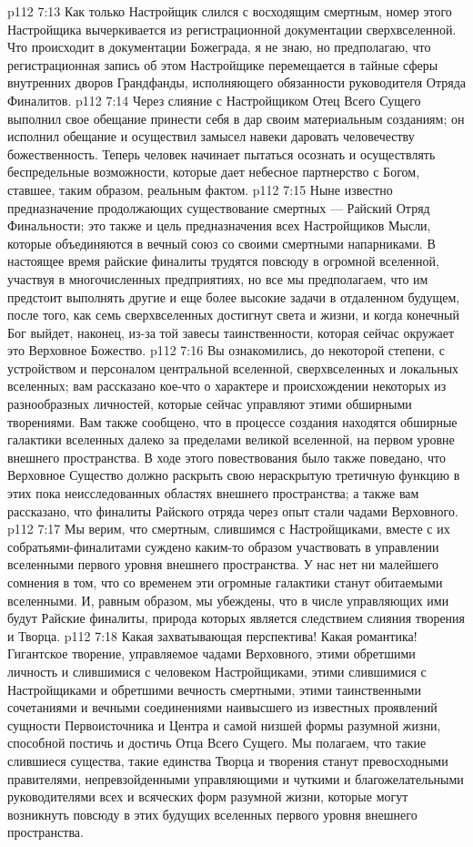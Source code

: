 \vs p112 7:13 Как только Настройщик слился с восходящим смертным, номер этого Настройщика вычеркивается из регистрационной документации сверхвселенной. Что происходит в документации Божеграда, я не знаю, но предполагаю, что регистрационная запись об этом Настройщике перемещается в тайные сферы внутренних дворов Грандфанды, исполняющего обязанности руководителя Отряда Финалитов.
\vs p112 7:14 Через слияние с Настройщиком Отец Всего Сущего выполнил свое обещание принести себя в дар своим материальным созданиям; он исполнил обещание и осуществил замысел навеки даровать человечеству божественность. Теперь человек начинает пытаться осознать и осуществлять беспредельные возможности, которые дает небесное партнерство с Богом, ставшее, таким образом, реальным фактом.
\vs p112 7:15 \pc Ныне известно предназначение продолжающих существование смертных --- Райский Отряд Финальности; это также и цель предназначения всех Настройщиков Мысли, которые объединяются в вечный союз со своими смертными напарниками. В настоящее время райские финалиты трудятся повсюду в огромной вселенной, участвуя в многочисленных предприятиях, но все мы предполагаем, что им предстоит выполнять другие и еще более высокие задачи в отдаленном будущем, после того, как семь сверхвселенных достигнут света и жизни, и когда конечный Бог выйдет, наконец, из\hyp{}за той завесы таинственности, которая сейчас окружает это Верховное Божество.
\vs p112 7:16 Вы ознакомились, до некоторой степени, с устройством и персоналом центральной вселенной, сверхвселенных и локальных вселенных; вам рассказано кое\hyp{}что о характере и происхождении некоторых из разнообразных личностей, которые сейчас управляют этими обширными творениями. Вам также сообщено, что в процессе создания находятся обширные галактики вселенных далеко за пределами великой вселенной, на первом уровне внешнего пространства. В ходе этого повествования было также поведано, что Верховное Существо должно раскрыть свою нераскрытую третичную функцию в этих пока неисследованных областях внешнего пространства; а также вам рассказано, что финалиты Райского отряда через опыт стали чадами Верховного.
\vs p112 7:17 Мы верим, что смертным, слившимся с Настройщиками, вместе с их собратьями\hyp{}финалитами суждено каким\hyp{}то образом участвовать в управлении вселенными первого уровня внешнего пространства. У нас нет ни малейшего сомнения в том, что со временем эти огромные галактики станут обитаемыми вселенными. И, равным образом, мы убеждены, что в числе управляющих ими будут Райские финалиты, природа которых является следствием слияния творения и Творца.
\vs p112 7:18 Какая захватывающая перспектива! Какая романтика! Гигантское творение, управляемое чадами Верховного, этими обретшими личность и слившимися с человеком Настройщиками, этими слившимися с Настройщиками и обретшими вечность смертными, этими таинственными сочетаниями и вечными соединениями наивысшего из известных проявлений сущности Первоисточника и Центра и самой низшей формы разумной жизни, способной постичь и достичь Отца Всего Сущего. Мы полагаем, что такие слившиеся существа, такие единства Творца и творения станут превосходными правителями, непревзойденными управляющими и чуткими и благожелательными руководителями всех и всяческих форм разумной жизни, которые могут возникнуть повсюду в этих будущих вселенных первого уровня внешнего пространства.
